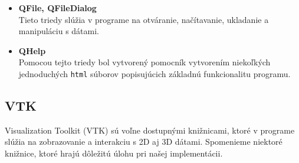\documentclass[a4paper,11pt,oneside]{article}%
\begin{document}
\begin{itemize}
\item \textbf{QFile, QFileDialog} \\
Tieto triedy slúžia v programe na otváranie, načítavanie, ukladanie a manipuláciu s dátami.

\item \textbf{QHelp} \\
Pomocou tejto triedy bol vytvorený pomocník vytvorením niekoľkých jednoduchých \texttt{html} súborov popisujúcich základnú funkcionalitu programu.

\end{itemize}

\subsection{VTK}

Visualization Toolkit (VTK) sú voľne dostupnými knižnicami, ktoré v programe slúžia na zobrazovanie a interakciu s 2D aj 3D dátami. Spomenieme niektoré knižnice, ktoré hrajú dôležitú úlohu pri našej implementácii.
\end{document}
